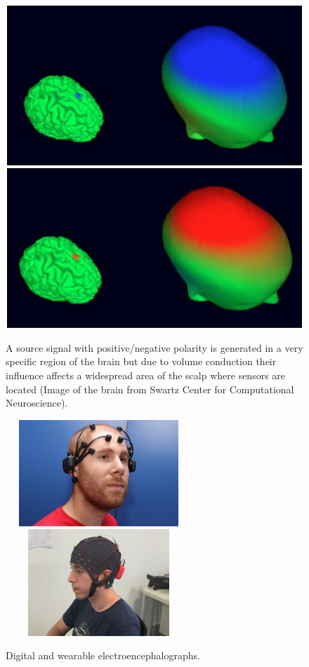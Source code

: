 \documentclass[aspectratio=169]{beamer}
\begin{document}
\begin{frame}    
\begin{figure}[]
\centering
\includegraphics[height=6cm,width=1\textwidth]{images/volconduction1.png}
\includegraphics[height=6cm,width=1\textwidth]{images/volconduction2.png}
\caption[EEG Volume Conduction]{A source signal with positive/negative polarity is generated in a very specific region of the brain but due to volume conduction their influence affects a widespread area of the scalp where sensors are located (Image of the brain from Swartz Center for Computational Neuroscience).}
\label{fig:volconduction}
\end{figure}
\end{frame}

\begin{frame}   
\begin{figure}[]
\centering
\includegraphics[height=4cm,width=7cm]{images/emotivsubject.jpg}
\includegraphics[height=4cm,width=7cm]{images/gTecsubject.jpg}
\caption[Wearable portable Digital Electroencephalograph]{Digital and wearable electroencephalographs.}
\label{fig:digitalelectroencephalograph}
\end{figure}
\end{frame}
\end{document}
